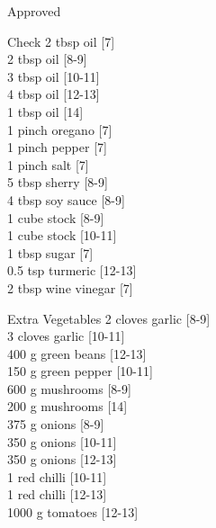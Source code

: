 \begin{menu}{Approved}
\begin{shoppinglist}{Check}
      2 tbsp oil 
        {\scriptsize[7]}\\
      2 tbsp oil 
        {\scriptsize[8-9]}\\
      3 tbsp oil 
        {\scriptsize[10-11]}\\
      4 tbsp oil 
        {\scriptsize[12-13]}\\
      1 tbsp oil 
        {\scriptsize[14]}\\
      1 pinch oregano 
        {\scriptsize[7]}\\
      1 pinch pepper 
        {\scriptsize[7]}\\
      1 pinch salt 
        {\scriptsize[7]}\\
      5 tbsp sherry 
        {\scriptsize[8-9]}\\
      4 tbsp soy sauce 
        {\scriptsize[8-9]}\\
      1 cube stock 
        {\scriptsize[8-9]}\\
      1 cube stock 
        {\scriptsize[10-11]}\\
      1 tbsp sugar 
        {\scriptsize[7]}\\
      0.5 tsp turmeric 
        {\scriptsize[12-13]}\\
      2 tbsp wine vinegar 
        {\scriptsize[7]}\\
      \end{shoppinglist}%
      \begin{shoppinglist}{Extra Vegetables}
      2 cloves garlic 
        {\scriptsize[8-9]}\\
      3 cloves garlic 
        {\scriptsize[10-11]}\\
      400 g green beans 
        {\scriptsize[12-13]}\\
      150 g green pepper 
        {\scriptsize[10-11]}\\
      600 g mushrooms 
        {\scriptsize[8-9]}\\
      200 g mushrooms 
        {\scriptsize[14]}\\
      375 g onions 
        {\scriptsize[8-9]}\\
      350 g onions 
        {\scriptsize[10-11]}\\
      350 g onions 
        {\scriptsize[12-13]}\\
      1  red chilli 
        {\scriptsize[10-11]}\\
      1  red chilli 
        {\scriptsize[12-13]}\\
      1000 g tomatoes 
        {\scriptsize[12-13]}\\
      \end{shoppinglist}%
      \par\vfil %
    \vfil\clearpage
  

\end{menu}
